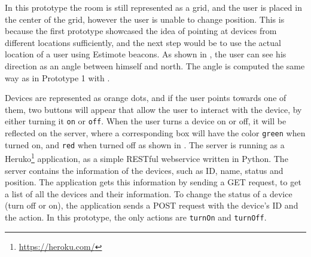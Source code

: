 In this prototype the room is still represented as a grid, 
and the user is placed in the center of the grid, 
however the user is unable to change position.
This is because the first prototype showcased the idea of pointing at devices from different locations sufficiently, 
and the next step would be to use the actual location of a user using Estimote beacons.
As shown in , 
the user can see his direction as an angle between himself and north.
The angle is computed the same way as in Prototype 1 with .

Devices are represented as orange dots, 
and if the user points towards one of them, 
two buttons will appear that allow the user to interact with the device, 
by either turning it \texttt{on} or \texttt{off}.
When the user turns a device on or off, 
it will be reflected on the server, 
where a corresponding box will have the color \texttt{green} when turned on, 
and \texttt{red} when turned off as shown in .
The server is running as a Heruko\footnote{\url{https://heroku.com/}} application, 
as a simple RESTful webservice written in Python. 
The server contains the information of the devices, 
such as ID, name, status and position.
The application gets this information by sending a GET request, 
to get a list of all the devices and their information. 
To change the status of a device (turn off or on), 
the application sends a POST request with the device's ID and the action. 
In this prototype, the only actions are \texttt{turnOn} and \texttt{turnOff}.

